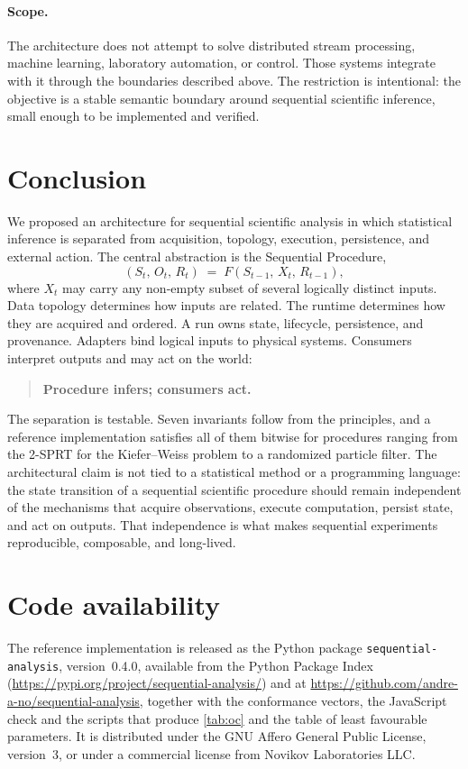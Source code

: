\documentclass[11pt,a4paper]{article}
\theoremstyle{definition}
\theoremstyle{remark}
\begin{document}
\paragraph{Scope.}
The architecture does not attempt to solve distributed stream
processing, machine learning, laboratory automation, or control. Those
systems integrate with it through the boundaries described above. The
restriction is intentional: the objective is a stable semantic boundary
around sequential scientific inference, small enough to be implemented
and verified.

\section{Conclusion}
\label{sec:conclusion}

We proposed an architecture for sequential scientific analysis in which
statistical inference is separated from acquisition, topology,
execution, persistence, and external action. The central abstraction is
the Sequential Procedure,
\[
(S_t,\,O_t,\,R_t) \;=\; F(S_{t-1},\,X_t,\,R_{t-1}),
\]
where $X_t$ may carry any non-empty subset of several logically distinct
inputs. Data topology determines how inputs are related. The runtime
determines how they are acquired and ordered. A run owns state,
lifecycle, persistence, and provenance. Adapters bind logical inputs to
physical systems. Consumers interpret outputs and may act on the world:

\begin{quote}
\textbf{Procedure infers; consumers act.}
\end{quote}

The separation is testable. Seven invariants follow from the principles,
and a reference implementation satisfies all of them bitwise for
procedures ranging from the 2-SPRT for the Kiefer--Weiss problem to a
randomized particle filter. The architectural claim is not tied to a
statistical method or a programming language: the state transition of a
sequential scientific procedure should remain independent of the
mechanisms that acquire observations, execute computation, persist
state, and act on outputs. That independence is what makes sequential
experiments reproducible, composable, and long-lived.

\section*{Code availability}

The reference implementation is released as the Python package
\texttt{sequential-analysis}, version~0.4.0, available from the Python
Package Index (\url{https://pypi.org/project/sequential-analysis/}) and
at \url{https://github.com/andre-a-no/sequential-analysis}, together with
the conformance vectors, the JavaScript check and the scripts that
produce \cref{tab:oc} and the table of least favourable parameters. It
is distributed under the GNU Affero General Public License, version~3,
or under a commercial license from Novikov Laboratories LLC.

\printbibliography
\end{document}
